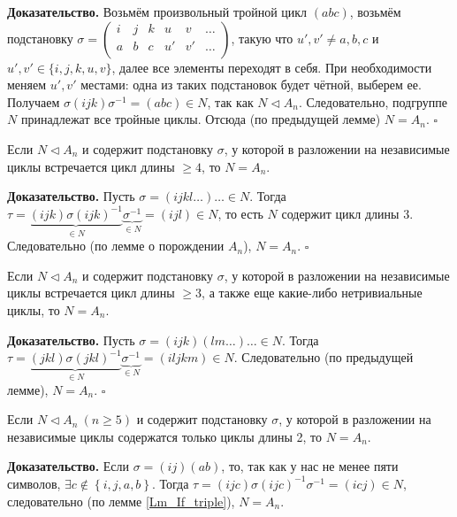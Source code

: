 \textbf{Доказательство.}
%
Возьмём произвольный тройной цикл \(\left( {{abc}} \right)\),
возьмём подстановку
\(\sigma = \begin{pmatrix}
i & j & k & u & v & \ldots \\
a & b & c & u' & v' & \ldots \\
\end{pmatrix}\), такую что
\(u', v' \neq a, b, c\) и \(u', v'\in\{i,j,k,u,v\} \), далее все элементы
переходят в себя.
При необходимости меняем $u', v'$ местами: одна из таких подстановок будет чётной, выберем ее.
Получаем
\(\sigma\left( {{ijk}} \right)\sigma^{-1} = \left( {{abc}} \right) \in N\),
так как \(N \vartriangleleft A_{n}\). Следовательно, подгруппе \(N\)
принадлежат все тройные циклы. Отсюда (по предыдущей лемме)
\(N = A_{n}\). $\square$

\begin{lemma}
	Если \(N\vartriangleleft A_n\) и содержит подстановку \(\sigma\), у которой в разложении на независимые циклы встречается цикл длины \(\geqslant4\), то \(N = A_{n}\).
\end{lemma}
\textbf{Доказательство.}
%
Пусть \(\sigma = \left( {{ijkl}}\ldots \right)\ldots\in N\).
Тогда
\(\tau = \underset{\in N}{\underbrace{(ijk)\sigma(ijk)^{-1}}}\underset{\in N}{\underbrace{\sigma^{-1}}} = (ijl) \in N\),
то есть \(N\) содержит цикл длины 3.
Следовательно (по лемме о порождении $A_n$), \(N = A_{n}\).
$\square$

\begin{lemma}
	Если \(N\vartriangleleft A_n\) и содержит подстановку \(\sigma\), у которой в разложении на независимые циклы встречается цикл длины \(\geqslant3\), а также еще какие-либо нетривиальные циклы, то \(N = A_{n}\).
\end{lemma}
\textbf{Доказательство.}
Пусть \(\sigma = (ijk)(lm\ldots)\ldots\in N\).
Тогда
\(\tau = \underset{\in N}{\underbrace{(jkl)\sigma(jkl)^{-1}}} \underset{\in N}{\underbrace{\sigma^{-1}}} = \left(iljkm\right) \in N\).
Следовательно (по предыдущей лемме),
\(N = A_{n}\). $\square$

\begin{lemma}
	Если \(N\vartriangleleft A_n\ (n\geqslant5)\) и содержит подстановку \(\sigma\), у которой в разложении на независимые циклы содержатся только циклы длины 2, то \(N = A_{n}\).
\end{lemma}

\textbf{Доказательство.}
%
Если
\(\sigma = \left( {{ij}} \right)\left( {{ab}} \right)\),
то, так как у нас не менее пяти символов,
\(\exists c \notin \left\{ i,j,a,b \right\}\). Тогда
\(\tau = \left( {{ijc}} \right)\sigma\left( {{ijc}} \right)^{-1}\sigma^{-1} = \left( {{icj}} \right) \in N\),
следовательно (по лемме \ref{Lm_If_triple}), \(N = A_{n}\).

